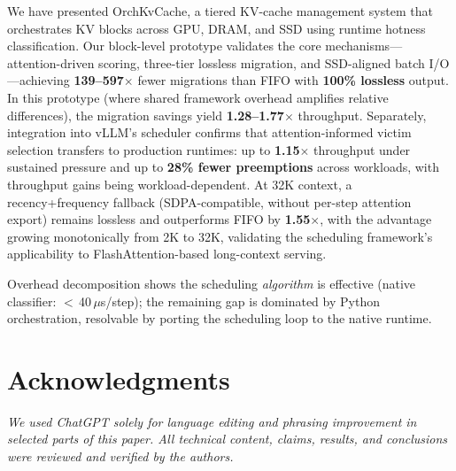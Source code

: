 \documentclass[conference]{IEEEtran}
\begin{document}
We have presented OrchKvCache, a tiered KV-cache management system that orchestrates KV blocks across GPU, DRAM, and SSD using runtime hotness classification. Our block-level prototype validates the core mechanisms---attention-driven scoring, three-tier lossless migration, and SSD-aligned batch I/O---achieving \textbf{139--597$\times$} fewer migrations than FIFO with \textbf{100\% lossless} output. In this prototype (where shared framework overhead amplifies relative differences), the migration savings yield \textbf{1.28--1.77$\times$} throughput. Separately, integration into vLLM's scheduler confirms that attention-informed victim selection transfers to production runtimes: up to \textbf{1.15$\times$} throughput under sustained pressure and up to \textbf{28\% fewer preemptions} across workloads, with throughput gains being workload-dependent. At 32K context, a recency+frequency fallback (SDPA-compatible, without per-step attention export) remains lossless and outperforms FIFO by \textbf{1.55$\times$}, with the advantage growing monotonically from 2K to 32K, validating the scheduling framework's applicability to FlashAttention-based long-context serving.

Overhead decomposition shows the scheduling \emph{algorithm} is effective (native classifier: $<$\,40\,$\mu$s/step); the remaining gap is dominated by Python orchestration, resolvable by porting the scheduling loop to the native runtime.

\section*{Acknowledgments}
\textit{We used ChatGPT solely for language editing and phrasing improvement in selected parts of this paper. All technical content, claims, results, and conclusions were reviewed and verified by the authors.}
\end{document}
